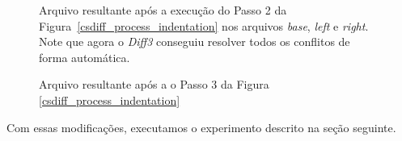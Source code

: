\begin{figure}[ht]
	\begin{center}
		
		\caption{Arquivo resultante após a execução do Passo 2 da Figura~\ref{csdiff_process_indentation} nos arquivos
			\emph{base}, \emph{left} e \emph{right}. Note que agora o \emph{Diff3} conseguiu resolver todos
			os conflitos de forma automática.
		}\label{diff3_marcadores_indentacao}
	\end{center}
\end{figure}

\begin{figure}[ht]
	\begin{center}
		
		\caption{Arquivo resultante após a o Passo 3 da Figura
			\ref{csdiff_process_indentation}}\label{csdiff_indentacao}
	\end{center}
\end{figure}

Com essas modificações, executamos o experimento descrito na seção seguinte.

